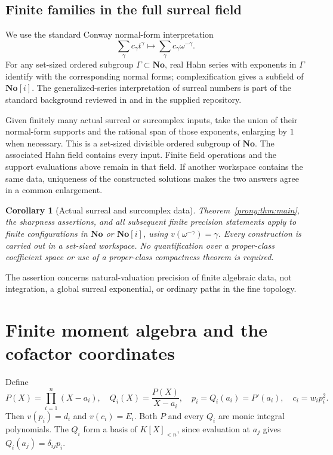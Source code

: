 \documentclass[11pt,letterpaper]{article}
\newtheorem{corollary}[theorem]{Corollary}
\theoremstyle{definition}
\theoremstyle{remark}
\newcommand{\No}{\mathbf{No}}
\newcommand{\SC}{\mathbf{No}[i]}
\begin{document}
\subsection{Finite families in the full surreal field}
We use the standard Conway normal-form interpretation
\[
 \sum_\gamma c_\gamma t^\gamma
 \longmapsto \sum_\gamma c_\gamma\omega^{-\gamma}.
\]
For any set-sized ordered subgroup $\Gamma\subset\No$, real Hahn series
with exponents in $\Gamma$ identify with the corresponding normal forms;
complexification gives a subfield of $\SC$. The generalized-series
interpretation of surreal numbers is part of the standard background
reviewed in \cite{BG} and in the supplied repository.

Given finitely many actual surreal or surcomplex inputs, take the union of
their normal-form supports and the rational span of those exponents,
enlarging by $1$ when necessary. This is a set-sized divisible ordered
subgroup of $\No$. The associated Hahn field contains every input. Finite
field operations and the support evaluations above remain in that field.
If another workspace contains the same data, uniqueness of the constructed
solutions makes the two answers agree in a common enlargement.

\begin{corollary}[Actual surreal and surcomplex data]\label{prony:cor:actual}
Theorem~\ref{prony:thm:main}, the sharpness assertions, and all subsequent finite
precision statements apply to finite configurations in $\No$ or $\SC$,
using $v(\omega^{-\gamma})=\gamma$. Every construction is carried out in a
set-sized workspace. No quantification over a proper-class coefficient
space or use of a proper-class compactness theorem is required.
\end{corollary}
The assertion concerns natural-valuation precision of finite algebraic
data, not integration, a global surreal exponential, or ordinary paths in
the fine topology.

\section{Finite moment algebra and the cofactor coordinates}
\label{prony:sec:algebra}

Define
\begin{equation}\label{prony:eq:cofactor}
 P(X)=\prod_{i=1}^n(X-a_i),\quad
 Q_i(X)=\frac{P(X)}{X-a_i},\quad
 p_i=Q_i(a_i)=P'(a_i),\quad c_i=w_i p_i^2.
\end{equation}
Then $v(p_i)=d_i$ and $v(c_i)=E_i$. Both $P$ and every $Q_i$ are monic
integral polynomials. The $Q_i$ form a basis of $K[X]_{<n}$, since
evaluation at $a_j$ gives $Q_i(a_j)=\delta_{ij}p_i$.
\end{document}
